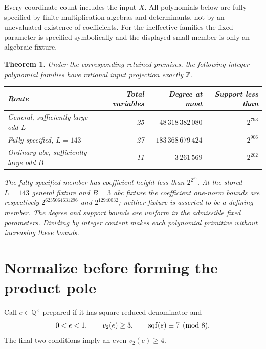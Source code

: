\documentclass[11pt]{article}
\newtheorem{theorem}{Theorem}
\newcommand{\Q}{\mathbb Q}\newcommand{\Z}{\mathbb Z}
\begin{document}
Every coordinate count includes the input $X$. All polynomials below
are fully specified by finite multiplication algebras and determinants,
not by an unevaluated existence of coefficients. For the ineffective
families the fixed parameter is specified symbolically and the displayed
small member is only an algebraic fixture.

\begin{theorem}\label{main}
Under the corresponding retained premises, the following integer-polynomial
families have rational input projection exactly $\Z$.
\begin{center}\small
\begin{tabular}{lrrr}
\toprule
Route&Total variables&Degree at most&Support less than\\\midrule
General, sufficiently large odd $L$&25&$48\,318\,382\,080$&$2^{793}$\\
Fully specified, $L=143$&27&$183\,368\,679\,424$&$2^{906}$\\
Ordinary abc, sufficiently large odd $B$&11&$3\,261\,569$&$2^{202}$\\\bottomrule
\end{tabular}
\end{center}
The fully specified member has coefficient height less than $2^{2^{45}}$.
At the stored $L=143$ general fixture and $B=3$ abc fixture the coefficient
one-norm bounds are respectively
$2^{6235064631296}$ and $2^{12940032}$; neither fixture is asserted to be
a defining member. The degree and support bounds are uniform in the
admissible fixed parameters. Dividing by integer content makes each
polynomial primitive without increasing these bounds.
\end{theorem}

\section{Normalize before forming the product pole}
Call $e\in\Q^\times$ prepared if it has square reduced denominator and
\[
 0<e<1,\qquad v_2(e)\ge3,\qquad\operatorname{sqf}(e)\equiv7\pmod8.
\]
The final two conditions imply an even $v_2(e)\ge4$.
\end{document}
